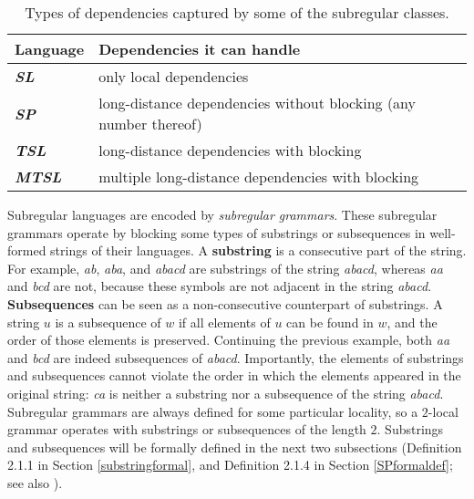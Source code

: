 \begin{table}[h!]
\begin{center}
\begin{tabular}{|l|l|}
\hline
\textbf{Language}      & \textbf{Dependencies it can handle}                       \\ \hline
\textit{\textbf{SL}}   & only local dependencies                                   \\ \hline
\textit{\textbf{SP}}   & long-distance dependencies without blocking (any number thereof) \\ \hline
\textit{\textbf{TSL}}  & long-distance dependencies with blocking                  \\ \hline
\textit{\textbf{MTSL}} & multiple long-distance dependencies with blocking         \\ \hline
\end{tabular}
\caption{Types of dependencies captured by some of the subregular classes.}
\label{subregclasses}
\end{center}
\end{table}



Subregular languages are encoded by \emph{subregular grammars}.
These subregular grammars operate by blocking some types of substrings or subsequences in well-formed strings of their languages.
A \textbf{substring} is a consecutive part of the string.
For example, \emph{ab}, \emph{aba}, and \emph{abacd} are substrings of the string \emph{abacd}, whereas \emph{aa} and \emph{bcd} are not, because these symbols are not adjacent in the string \emph{abacd}.
\textbf{Subsequences} can be seen as a non-consecutive counterpart of substrings.
A string $u$ is a subsequence of $w$ if all elements of $u$ can be found in $w$, and the order of those elements is preserved.
Continuing the previous example, both \emph{aa} and \emph{bcd} are indeed subsequences of \emph{abacd}.
Importantly, the elements of substrings and subsequences cannot violate the order in which the elements appeared in the original string: \emph{ca} is neither a substring nor a subsequence of the string \emph{abacd}.
Subregular grammars are always defined for some particular locality, so a $2$-local grammar operates with substrings or subsequences of the length $2$.
Substrings and subsequences will be formally defined in the next two subsections (Definition 2.1.1 in Section \ref{substringformal}, and Definition 2.1.4 in Section \ref{SPformaldef}; see also \citep[a.o.]{ElzingaEtAl2008,Rogers-HeinzEtAl-2010-LPTSS,Fu2011}).

